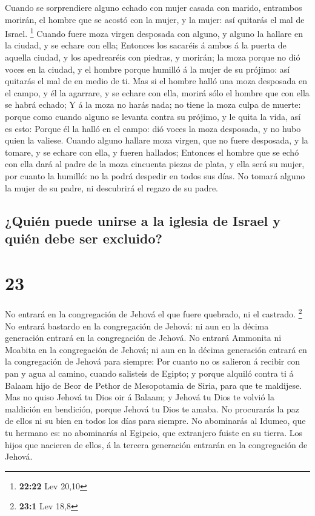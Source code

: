  Cuando se sorprendiere alguno echado con mujer casada con
marido, entrambos morirán, el hombre que se acostó con la mujer, y la
mujer: así quitarás el mal de Israel. \footnote{\textbf{22:22} Lev 20,10}
 Cuando fuere moza virgen desposada con alguno, y alguno la
hallare en la ciudad, y se echare con ella;  Entonces los
sacaréis á ambos á la puerta de aquella ciudad, y los apedrearéis con
piedras, y morirán; la moza porque no dió voces en la ciudad, y el
hombre porque humilló á la mujer de su prójimo: así quitarás el mal de
en medio de ti.  Mas si el hombre halló una moza desposada
en el campo, y él la agarrare, y se echare con ella, morirá sólo el
hombre que con ella se habrá echado;  Y á la moza no harás
nada; no tiene la moza culpa de muerte: porque como cuando alguno se
levanta contra su prójimo, y le quita la vida, así es esto:
 Porque él la halló en el campo: dió voces la moza
desposada, y no hubo quien la valiese.  Cuando alguno
hallare moza virgen, que no fuere desposada, y la tomare, y se echare
con ella, y fueren hallados;  Entonces el hombre que se
echó con ella dará al padre de la moza cincuenta piezas de plata, y ella
será su mujer, por cuanto la humilló: no la podrá despedir en todos sus
días.  No tomará alguno la mujer de su padre, ni descubrirá
el regazo de su padre.

\hypertarget{quiuxe9n-puede-unirse-a-la-iglesia-de-israel-y-quiuxe9n-debe-ser-excluido}{%
\subsection{¿Quién puede unirse a la iglesia de Israel y quién debe ser
excluido?}\label{quiuxe9n-puede-unirse-a-la-iglesia-de-israel-y-quiuxe9n-debe-ser-excluido}}

\hypertarget{section-22}{%
\section{23}\label{section-22}}

 No entrará en la congregación de Jehová el que fuere
quebrado, ni el castrado. \footnote{\textbf{23:1} Lev 18,8} 
No entrará bastardo en la congregación de Jehová: ni aun en la décima
generación entrará en la congregación de Jehová.  No entrará
Ammonita ni Moabita en la congregación de Jehová; ni aun en la décima
generación entrará en la congregación de Jehová para siempre:
 Por cuanto no os salieron á recibir con pan y agua al
camino, cuando salisteis de Egipto; y porque alquiló contra ti á Balaam
hijo de Beor de Pethor de Mesopotamia de Siria, para que te maldijese.
 Mas no quiso Jehová tu Dios oir á Balaam; y Jehová tu Dios
te volvió la maldición en bendición, porque Jehová tu Dios te amaba.
 No procurarás la paz de ellos ni su bien en todos los días
para siempre.  No abominarás al Idumeo, que tu hermano es:
no abominarás al Egipcio, que extranjero fuiste en su tierra.
 Los hijos que nacieren de ellos, á la tercera generación
entrarán en la congregación de Jehová.

